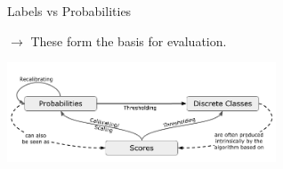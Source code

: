 \documentclass[11pt,compress,t,notes=noshow, xcolor=table]{beamer}
\begin{document}
\begin{vbframe}{Labels vs Probabilities}
\vfill

$\rightarrow$ These form the basis for evaluation.

\vfill

  \includegraphics[width = 0.6\textwidth]{figure_man/classifiers.png}


\end{vbframe}

\end{document}
